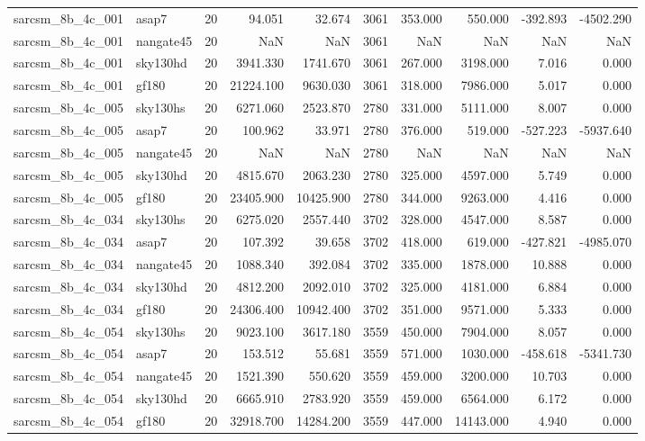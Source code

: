 \begin{longtable}{llrrrrrrrr}
sarcsm\_8b\_4c\_001 & asap7 & 20 & 94.051 & 32.674 & 3061 & 353.000 & 550.000 & -392.893 & -4502.290 \\
sarcsm\_8b\_4c\_001 & nangate45 & 20 & NaN & NaN & 3061 & NaN & NaN & NaN & NaN \\
sarcsm\_8b\_4c\_001 & sky130hd & 20 & 3941.330 & 1741.670 & 3061 & 267.000 & 3198.000 & 7.016 & 0.000 \\
sarcsm\_8b\_4c\_001 & gf180 & 20 & 21224.100 & 9630.030 & 3061 & 318.000 & 7986.000 & 5.017 & 0.000 \\
sarcsm\_8b\_4c\_005 & sky130hs & 20 & 6271.060 & 2523.870 & 2780 & 331.000 & 5111.000 & 8.007 & 0.000 \\
sarcsm\_8b\_4c\_005 & asap7 & 20 & 100.962 & 33.971 & 2780 & 376.000 & 519.000 & -527.223 & -5937.640 \\
sarcsm\_8b\_4c\_005 & nangate45 & 20 & NaN & NaN & 2780 & NaN & NaN & NaN & NaN \\
sarcsm\_8b\_4c\_005 & sky130hd & 20 & 4815.670 & 2063.230 & 2780 & 325.000 & 4597.000 & 5.749 & 0.000 \\
sarcsm\_8b\_4c\_005 & gf180 & 20 & 23405.900 & 10425.900 & 2780 & 344.000 & 9263.000 & 4.416 & 0.000 \\
sarcsm\_8b\_4c\_034 & sky130hs & 20 & 6275.020 & 2557.440 & 3702 & 328.000 & 4547.000 & 8.587 & 0.000 \\
sarcsm\_8b\_4c\_034 & asap7 & 20 & 107.392 & 39.658 & 3702 & 418.000 & 619.000 & -427.821 & -4985.070 \\
sarcsm\_8b\_4c\_034 & nangate45 & 20 & 1088.340 & 392.084 & 3702 & 335.000 & 1878.000 & 10.888 & 0.000 \\
sarcsm\_8b\_4c\_034 & sky130hd & 20 & 4812.200 & 2092.010 & 3702 & 325.000 & 4181.000 & 6.884 & 0.000 \\
sarcsm\_8b\_4c\_034 & gf180 & 20 & 24306.400 & 10942.400 & 3702 & 351.000 & 9571.000 & 5.333 & 0.000 \\
sarcsm\_8b\_4c\_054 & sky130hs & 20 & 9023.100 & 3617.180 & 3559 & 450.000 & 7904.000 & 8.057 & 0.000 \\
sarcsm\_8b\_4c\_054 & asap7 & 20 & 153.512 & 55.681 & 3559 & 571.000 & 1030.000 & -458.618 & -5341.730 \\
sarcsm\_8b\_4c\_054 & nangate45 & 20 & 1521.390 & 550.620 & 3559 & 459.000 & 3200.000 & 10.703 & 0.000 \\
sarcsm\_8b\_4c\_054 & sky130hd & 20 & 6665.910 & 2783.920 & 3559 & 459.000 & 6564.000 & 6.172 & 0.000 \\
sarcsm\_8b\_4c\_054 & gf180 & 20 & 32918.700 & 14284.200 & 3559 & 447.000 & 14143.000 & 4.940 & 0.000 \\

\end{longtable}
